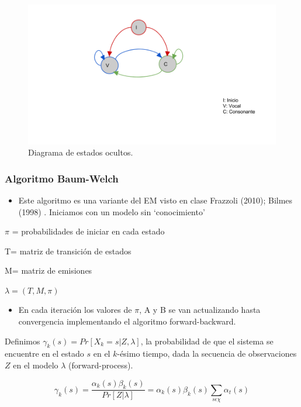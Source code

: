 \documentclass[]{article}
\begin{document}
\begin{figure}[htbp]
\centering
\includegraphics{modelo_vocales.png}
\caption{Diagrama de estados ocultos.}
\end{figure}

\subsubsection{Algoritmo Baum-Welch}\label{algoritmo-baum-welch}

\begin{itemize}
\itemsep1pt\parskip0pt
\item
  Este algoritmo es una variante del EM visto en clase Frazzoli (2010);
  Bilmes (1998) . Iniciamos con un modelo sin `conocimiento'
\end{itemize}

$\pi$ = probabilidades de iniciar en cada estado

T= matriz de transición de estados

M= matriz de emisiones

$\lambda=(T,M,\pi)$

\begin{itemize}
\itemsep1pt\parskip0pt
\item
  En cada iteración los valores de $\pi$, A y B se van actualizando
  hasta convergencia implementando el algoritmo forward-backward.
\end{itemize}

Definimos $\gamma_{k}(s)=Pr[X_{k}= s|Z,\lambda]$, la probabilidad de que
el sistema se encuentre en el estado $s$ en el $k$-ésimo tiempo, dada la
secuencia de observaciones $Z$ en el modelo $\lambda$ (forward-process).

\[
\gamma_{k}(s)=\frac{\alpha_{k}(s)\beta_{k}(s)}{Pr[Z|\lambda]}=\alpha_{k}(s)\beta_{k}(s){\sum_{s\epsilon\chi}\alpha_{t}(s)}
\]
\end{document}
